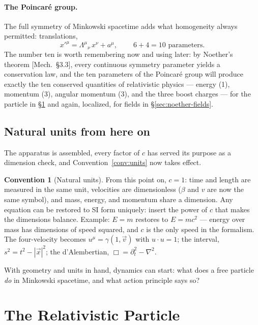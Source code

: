 \documentclass[11pt]{article}
\theoremstyle{plain}
\theoremstyle{definition}
\newtheorem{convention}[theorem]{Convention}
\theoremstyle{remark}
\newcommand{\vx}{\vec{x}}
\begin{document}
\paragraph{The Poincar\'e group.} The full symmetry of Minkowski
spacetime adds what homogeneity always permitted: translations,
\begin{equation}
  x'^\mu = \Lambda^\mu{}_\nu\, x^\nu + a^\mu ,
  \qquad
  \boxed{\ 6 + 4 = 10 \text{ parameters.}}
\end{equation}
The number ten is worth remembering now and using later: by
Noether's theorem [Mech.\ \S3.3], every continuous symmetry parameter
yields a conservation law, and the ten parameters of the Poincar\'e
group will produce exactly the ten conserved quantities of
relativistic physics --- energy (1), momentum (3), angular momentum
(3), and the three boost charges --- for the particle in
\S\ref{sec:relativistic-particle} and again, localized, for fields in
\S\ref{sec:noether-fields}.

\subsection{Natural units from here on}
\label{sec:natural-units}

The apparatus is assembled, every factor of $c$ has served its purpose
as a dimension check, and Convention~\ref{conv:units} now takes effect.

\begin{convention}[Natural units]\label{conv:c-equals-one}
From this point on, $c = 1$: time and length are measured in the same
unit, velocities are dimensionless ($\beta$ and $v$ are now the same
symbol), and mass, energy, and momentum share a dimension. Any equation
can be restored to SI form uniquely: insert the power of $c$ that makes
the dimensions balance. Example: $E = m$ restores to $E = mc^2$ ---
energy over mass has dimensions of speed squared, and $c$ is the only
speed in the formalism. The four-velocity becomes $u^\mu = \gamma(1,
\vec v)$ with $u \cdot u = 1$; the interval, $s^2 = t^2 - |\vx|^2$;
the d'Alembertian, $\Box = \partial_t^2 - \nabla^2$.
\end{convention}

\noindent
With geometry and units in hand, dynamics can start: what does a free
particle \emph{do} in Minkowski spacetime, and what action principle
says so?

\section{The Relativistic Particle}
\label{sec:relativistic-particle}
\end{document}
